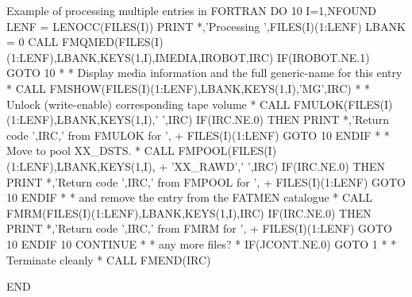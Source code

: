 \begin{XMPt}{Example of processing multiple entries in FORTRAN}
      DO 10 I=1,NFOUND                                            
      LENF = LENOCC(FILES(I))                                           
      PRINT *,'Processing ',FILES(I)(1:LENF)                            
      LBANK = 0                                                         
      CALL FMQMED(FILES(I)(1:LENF),LBANK,KEYS(1,I),IMEDIA,IROBOT,IRC)   
      IF(IROBOT.NE.1) GOTO 10                                           
*
*     Display media information and the full generic-name for this entry
*
      CALL FMSHOW(FILES(I)(1:LENF),LBANK,KEYS(1,I),'MG',IRC)            
*
*     Unlock (write-enable) corresponding tape volume
*
      CALL FMULOK(FILES(I)(1:LENF),LBANK,KEYS(1,I),' ',IRC)             
      IF(IRC.NE.0) THEN                                                 
         PRINT *,'Return code ',IRC,' from FMULOK for ',                
     +   FILES(I)(1:LENF)                                               
         GOTO 10                                                        
      ENDIF                                                             
*
*     Move to pool XX_DSTS. 
*
      CALL FMPOOL(FILES(I)(1:LENF),LBANK,KEYS(1,I),                     
     +            'XX_RAWD',' ',IRC)                                    
      IF(IRC.NE.0) THEN                                                 
         PRINT *,'Return code ',IRC,' from FMPOOL for ',                
     +   FILES(I)(1:LENF)                                               
         GOTO 10                                                        
      ENDIF                                                             
*
*     and remove the entry from the FATMEN catalogue
*
      CALL FMRM(FILES(I)(1:LENF),LBANK,KEYS(1,I),IRC)                   
      IF(IRC.NE.0) THEN                                                 
         PRINT *,'Return code ',IRC,' from FMRM for ',                  
     +   FILES(I)(1:LENF)                                               
         GOTO 10                                                        
      ENDIF                                                             
10    CONTINUE                                                          
*
*     any more files?
*
      IF(JCONT.NE.0) GOTO 1                                             
*                                                                       
*     Terminate cleanly                                                 
*                                                                       
      CALL FMEND(IRC)                                                   
                                                                        
      END                                                               
                                                                        
\end{XMPt}
